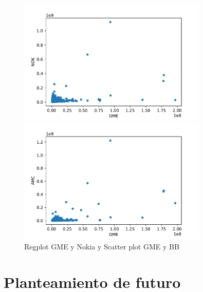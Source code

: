 \documentclass[12pt,twoside]{report}
\begin{document}
\begin{figure}[H]
\begin{multicols}{2}
    \includegraphics[width=9cm]{../code/figures/GME_NOK.pdf}\par 
    \includegraphics[width=9cm]{../code/figures/GME_AMC.pdf}\par 
\end{multicols}
\caption{Regplot GME y Nokia y Scatter plot GME y BB}
\label{fig:regplot-3}
\end{figure}


\chapter*{Planteamiento de futuro}


\medskip

\printbibliography[
heading=bibintoc,
title={Referencias}
]
\end{document}
